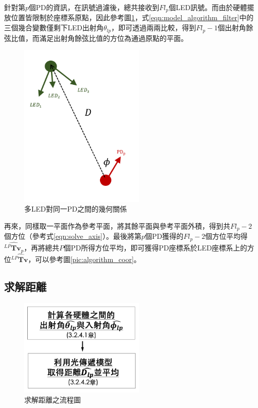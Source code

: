     針對第$p$個PD的資訊，在訊號過濾後，總共接收到$Fl_p$個LED訊號。而由於硬體擺放位置皆限制於座標系原點，因此參考圖\ref{pic:mulled_1pd}，式\ref{eqn:model_algorithm_filter}中的三個幾合變數僅剩下LED出射角$\theta_{lp}$，即可透過兩兩比較，得到$Fl_p-1$個出射角餘弦比值，而滿足出射角餘弦比值的方位為通過原點的平面。
    
    \begin{figure}[htpb]
        \centering
        \includegraphics[width=6cm]{ch3pic/mulled_1pd.png}
        \caption{多LED對同一PD之間的幾何關係}
        \label{pic:mulled_1pd}
    \end{figure}

    再來，同樣取一平面作為參考平面，將其餘平面與參考平面外積，得到共$Fl_p-2$個方位（參考式\ref{eqn:solve_axis}）。最後將第$p$個PD獲得的$Fl_p-2$個方位平均得$\hat{{^{LP}\boldsymbol{Tv}_{p}}}$，再將總共$P$個PD所得方位平均，即可獲得PD座標系於LED座標系上的方位$\hat{{^{LP}\boldsymbol{Tv}}}$，可以參考圖\ref{pic:algorithm_coor}。
         
    


    \subsection{求解距離}
    \label{chp:solve_D}

    \begin{figure}[htpb]
        \centering
        \includegraphics[width=6cm]{ch3pic/solve_dis_flow.png}
        \caption{求解距離之流程圖}
        \label{pic:solve_dis_flow}
    \end{figure}


